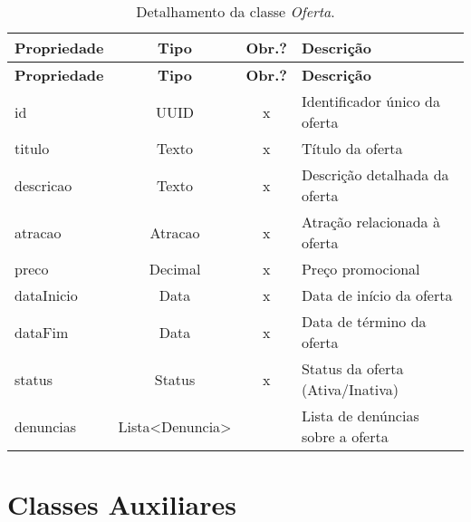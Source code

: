 \begin{longtable}{|p{3.5cm}|c|c|p{8cm}|}
    \caption{Detalhamento da classe \emph{Oferta}.}
    \label{tbl-dicionario-oferta} \\\hline 
    
    \rowcolor{lightgray}
    \textbf{Propriedade} & \textbf{Tipo} & \textbf{Obr.?} & \textbf{Descrição} \\\hline
    \endfirsthead
    \hline
    \rowcolor{lightgray}
    \textbf{Propriedade} & \textbf{Tipo} & \textbf{Obr.?} & \textbf{Descrição} \\\hline
    \endhead
    
    id & UUID & x & Identificador único da oferta \\\hline
    titulo & Texto & x & Título da oferta \\\hline
    descricao & Texto & x & Descrição detalhada da oferta \\\hline
    atracao & Atracao & x & Atração relacionada à oferta \\\hline
    preco & Decimal & x & Preço promocional \\\hline
    dataInicio & Data & x & Data de início da oferta \\\hline
    dataFim & Data & x & Data de término da oferta \\\hline
    status & Status & x & Status da oferta (Ativa/Inativa) \\\hline
    denuncias & Lista<Denuncia> & & Lista de denúncias sobre a oferta \\\hline
\end{longtable}

\section{Classes Auxiliares}
\label{sec-dicionario-auxiliares}

